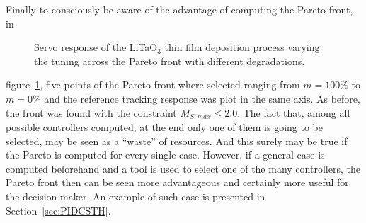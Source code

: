 Finally to consciously be aware of the advantage of computing the Pareto front, in %
%
\begin{figure}[tb]
	\centering
	\caption{Servo response of the LiTaO$_3$ thin film deposition process varying the tuning across the Pareto front with different degradations.}
	\label{fig:LitaServoParetoResp}
\end{figure}
%
figure~\ref{fig:LitaServoParetoResp}, five points of the Pareto front where selected ranging from $m=100\%$ to $m=0\%$ and the reference tracking response was plot in the same axis. As before, the front was found with the constraint $M_{S,max}\leq 2.0$. The fact that, among all possible controllers computed, at the end only one of them is going to be selected, may  be seen as a ``waste'' of resources. And this surely may be true if the Pareto is computed for every single case. However, if a general case is computed beforehand and a tool is used to select one of the many controllers, the Pareto front then can be seen more advantageous and certainly more useful for the decision maker. An example of such case is presented in Section~\ref{sec:PIDCSTH}. 


